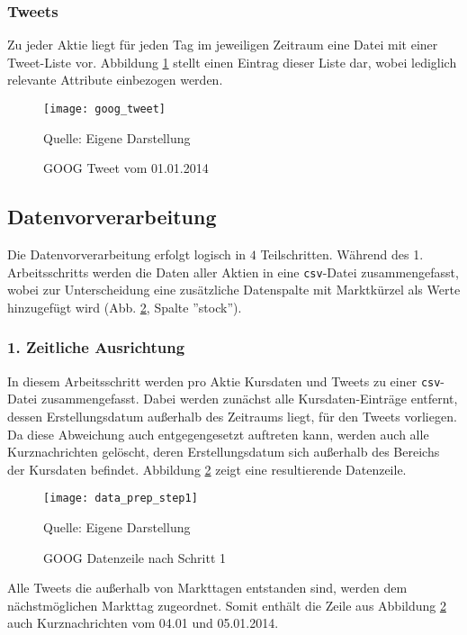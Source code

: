\subsubsection*{Tweets}\label{sec:data_ingestion_tweetdata}
Zu jeder Aktie liegt für jeden Tag im jeweiligen Zeitraum eine Datei mit einer Tweet-Liste vor. Abbildung \ref{fig:goog_tweet} stellt einen Eintrag dieser Liste dar, wobei lediglich relevante Attribute einbezogen werden.
\begin{figure}[H]
	\caption{GOOG Tweet vom 01.01.2014}
	\texttt{[image: goog\_tweet]}
	\label{fig:goog_tweet}
	\raggedright
	\normalsize{Quelle: Eigene Darstellung}
	\vspace{-1.0em}
\end{figure}


\subsection{Datenvorverarbeitung}\label{sec:data_prep}

Die Datenvorverarbeitung erfolgt logisch in $4$ Teilschritten. Während des 1. Arbeitsschritts werden die Daten aller Aktien in eine \texttt{csv}-Datei zusammengefasst, wobei zur Unterscheidung eine zusätzliche Datenspalte mit Marktkürzel als Werte hinzugefügt wird (Abb. \ref{fig:data_prep_step1}, Spalte ''stock'').

\subsubsection*{1. Zeitliche Ausrichtung}

In diesem Arbeitsschritt werden pro Aktie Kursdaten und Tweets zu einer \texttt{csv}-Datei zusammengefasst. Dabei werden zunächst alle Kursdaten-Einträge entfernt, dessen Erstellungsdatum außerhalb des Zeitraums liegt, für den Tweets vorliegen. Da diese Abweichung auch entgegengesetzt auftreten kann, werden auch alle Kurznachrichten gelöscht, deren Erstellungsdatum sich außerhalb des Bereichs der Kursdaten befindet. Abbildung \ref{fig:data_prep_step1} zeigt eine resultierende Datenzeile.
\begin{figure}[H]
	\caption{GOOG Datenzeile nach Schritt 1}
	\texttt{[image: data\_prep\_step1]}
	\label{fig:data_prep_step1}
	\raggedright
	\normalsize{Quelle: Eigene Darstellung}
	\vspace{-1.0em}
\end{figure}
Alle Tweets die außerhalb von Markttagen entstanden sind, werden dem nächstmöglichen Markttag zugeordnet. Somit enthält die Zeile aus Abbildung \ref{fig:data_prep_step1} auch Kurznachrichten vom 04.01 und 05.01.2014. 


